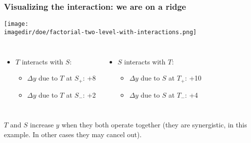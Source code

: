 \begin{frame}\frametitle{Visualizing the interaction: we are on a ridge}
	\begin{center}
		\texttt{[image: \\imagedir/doe/factorial-two-level-with-interactions.png]}
	\end{center}
	\vspace{-24pt}
	\begin{columns}[t]
			\begin{itemize}
				\item	$T$ interacts with $S$:
				\begin{itemize}
					\item	$\Delta y$ due to $T$ at $S_{+}$: +8
					\item	$\Delta y$ due to $T$ at $S_{-}$: +2
				\end{itemize}
			\end{itemize}
			\begin{itemize}
				\item	$S$ interacts with $T$:
				\begin{itemize}
					\item	$\Delta y$ due to $S$ at $T_{+}$: +10
					\item	$\Delta y$ due to $S$ at $T_{-}$: +4
				\end{itemize}
			\end{itemize}
	\end{columns}
	\vspace{6pt}
	$T$ and $S$ increase $y$ when they both operate together (they are synergistic, in this example. In other cases they may cancel out).
\end{frame}

